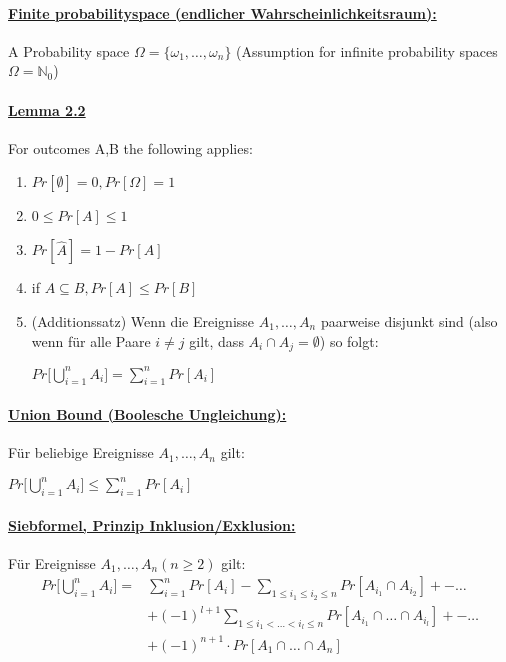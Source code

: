 \documentclass[8pt]{extreport}
\begin{document}
\paragraph{\underline{Finite probabilityspace (endlicher Wahrscheinlichkeitsraum):}} A Probability space $\Omega = \{\omega_{1},\dots,\omega_{n}\}$ (Assumption for infinite probability spaces $\Omega =\mathbb{N}_0$)
\paragraph{\underline{Lemma 2.2}} For outcomes A,B the following applies:
\begin{enumerate}
\item{$Pr[\emptyset] = 0, Pr[\Omega] = 1$}
\item{$0 \leq Pr[A] \leq 1$}
\item{$Pr[\hat{A}] = 1 - Pr[A]$}
\item{if $A\subseteq B, Pr[A] \leq Pr[B]$}
\item (Additionssatz) Wenn die Ereignisse $A_{1},\dots, A_{n}$ paarweise disjunkt sind (also wenn für alle Paare $i\neq j$ gilt, dass $A_{i} \cap A_{j} = \emptyset$) so folgt:
\begin{center}
$Pr\bigg[\bigcup\limits_{i=1}^{n} A_{i} \bigg] = \displaystyle\sum_{i=1}^{n}Pr[A_{i}]$
\end{center}
\end{enumerate}
\paragraph{\underline{Union Bound (Boolesche Ungleichung):}} Für beliebige Ereignisse $A_{1},\dots,A_{n}$ gilt:
\begin{center}
$Pr\bigg[\bigcup\limits_{i=1}^{n} A_{i} \bigg] \leq \displaystyle\sum_{i=1}^{n}Pr[A_{i}]$
\end{center}
\paragraph{\underline{Siebformel, Prinzip Inklusion/Exklusion:}} Für Ereignisse $A_{1},\dots,A_{n} (n\geq2)$ gilt:
\begin{align*}
	Pr\bigg[\bigcup\limits_{i=1}^{n} A_{i} \bigg] =  & \displaystyle\sum_{i=1}^{n}Pr[A_{i}] -\displaystyle\sum_{1\leq i_{1} \leq i_{2} \leq n}Pr[A_{i_{1}} \cap A_{i_{2}}] +- \dots \\
	 &+ (-1)^{l+1}\displaystyle\sum_{1\leq i_{1} < \dots < i_{l} \leq n}Pr[A_{i_{1}} \cap \dots \cap A_{i_{l}}] +- \dots \\ &+  (-1)^{n+1} \cdot Pr[A_1 \cap \dots \cap A_n]
 \end{align*}
\end{document}
